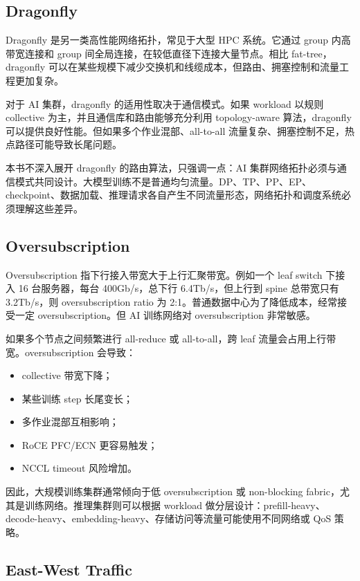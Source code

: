 \subsection{Dragonfly}
\label{subsec:dragonfly}

Dragonfly 是另一类高性能网络拓扑，常见于大型 HPC 系统。它通过 group 内高带宽连接和 group 间全局连接，在较低直径下连接大量节点。相比 fat-tree，dragonfly 可以在某些规模下减少交换机和线缆成本，但路由、拥塞控制和流量工程更加复杂。

对于 AI 集群，dragonfly 的适用性取决于通信模式。如果 workload 以规则 collective 为主，并且通信库和路由能够充分利用 topology-aware 算法，dragonfly 可以提供良好性能。但如果多个作业混部、all-to-all 流量复杂、拥塞控制不足，热点路径可能导致长尾问题。

本书不深入展开 dragonfly 的路由算法，只强调一点：AI 集群网络拓扑必须与通信模式共同设计。大模型训练不是普通均匀流量。DP、TP、PP、EP、checkpoint、数据加载、推理请求各自产生不同流量形态，网络拓扑和调度系统必须理解这些差异。

\subsection{Oversubscription}
\label{subsec:oversubscription}

Oversubscription 指下行接入带宽大于上行汇聚带宽。例如一个 leaf switch 下接入 16 台服务器，每台 400Gb/s，总下行 6.4Tb/s，但上行到 spine 总带宽只有 3.2Tb/s，则 oversubscription ratio 为 2:1。普通数据中心为了降低成本，经常接受一定 oversubscription。但 AI 训练网络对 oversubscription 非常敏感。

如果多个节点之间频繁进行 all-reduce 或 all-to-all，跨 leaf 流量会占用上行带宽。oversubscription 会导致：

\begin{itemize}
  \item collective 带宽下降；
  \item 某些训练 step 长尾变长；
  \item 多作业混部互相影响；
  \item RoCE PFC/ECN 更容易触发；
  \item NCCL timeout 风险增加。
\end{itemize}

因此，大规模训练集群通常倾向于低 oversubscription 或 non-blocking fabric，尤其是训练网络。推理集群则可以根据 workload 做分层设计：prefill-heavy、decode-heavy、embedding-heavy、存储访问等流量可能使用不同网络或 QoS 策略。

\subsection{East-West Traffic}
\label{subsec:east-west-traffic}

